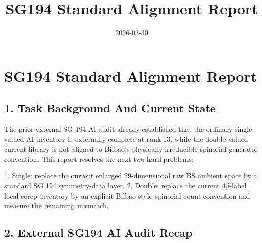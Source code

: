 \documentclass[11pt]{article}
\begin{document}
        \title{SG194 Standard Alignment Report}
        \date{2026-03-30}
        \maketitle
        \section*{SG194 Standard Alignment Report}

\subsection*{1. Task Background And Current State}

The prior external SG 194 AI audit already established that the ordinary single-valued AI inventory is externally complete at rank 13, while the double-valued current library is not aligned to Bilbao's physically irreducible spinorial generator convention. This report resolves the next two hard problems:

1. Single: replace the current enlarged 29-dimensional raw BS ambient space by a standard SG 194 symmetry-data layer.
2. Double: replace the current 45-label local-corep inventory by an explicit Bilbao-style spinorial count convention and measure the remaining mismatch.

\subsection*{2. External SG194 AI Audit Recap}
\end{document}
